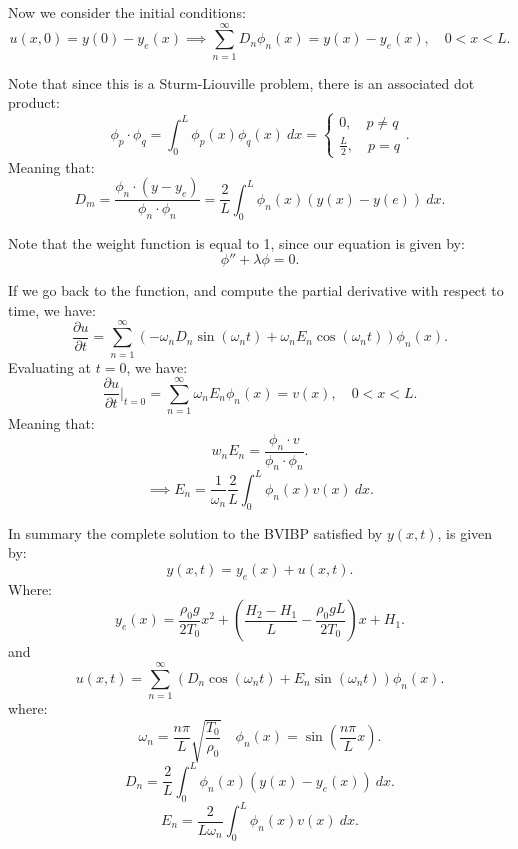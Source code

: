 \documentclass[../main/main.tex]{subfiles}
\begin{document}
Now we consider the initial conditions: \[
	u(x,0) = y(0) - y_e(x) \implies \sum_{n=1}^{\infty} D_n \phi_n(x) = y(x) - y_e(x), \quad 0 < x < L
.\] 

Note that since this is a Sturm-Liouville problem, there is an associated dot product: \[
	\phi_p \cdot  \phi_q = \int^L_0 \phi_p(x) \phi_q(x) ~dx = \begin{cases}
		0, \quad p\neq q \\ \frac{L}{2},\quad p = q
	\end{cases}
.\] Meaning that: \[
D_m = \frac{\phi_n \cdot  (y-y_e)}{\phi_n \cdot  \phi_n} = \frac{2}{L}\int^L_0 \phi_n(x) \left( y(x) - y(e) \right) ~dx
.\] 
\begin{remark}
	Note that the weight function is equal to 1, since our equation is given by: \[
	\phi'' + \lambda \phi = 0
	.\] 
\end{remark}

If we go back to the function, and compute the partial derivative with respect to time, we have: \[
	\frac{\partial u}{\partial t} = \sum_{n=1}^{\infty} \left( -\omega_n D_n \sin(\omega_nt) + \omega_n E_n \cos(\omega_n t)  \right) \phi_n(x)
.\] Evaluating at  $t=0$, we have: \[
	\frac{\partial u}{\partial t}\bigg\rvert_{t=0} = \sum_{n=1}^{\infty} \omega_n E_n \phi_n (x) = v(x) , \quad 0 < x < L 
.\]  Meaning that: \[
w_n E_n = \frac{\phi_n \cdot  v}{\phi_n \cdot  \phi_n}
.\] \[
\implies E_n = \frac{1}{\omega_n} \frac{2}{L} \int^L_0 \phi_n(x) v(x) ~dx
.\] 

In summary the complete solution to the BVIBP satisfied by $y(x,t)$, is given by: \[
	y(x,t) = y_e(x) + u(x,t)
.\] Where: \[
y_e(x) = \frac{\rho_0g}{2T_0} x^2 + \left( \frac{H_2-H_1}{L}- \frac{\rho_0gL}{2T_0} \right) x + H_1
.\] and \[
u(x,t) = \sum_{n=1}^{\infty} \left( D_n \cos(\omega_nt) + E_n \sin(\omega_nt) \right) \phi_n(x)
.\] where: \[
\omega_n = \frac{n\pi}{L}\sqrt{\frac{T_0}{\rho_0}} \quad \phi_n(x) = \sin\left( \frac{n\pi}{L}x \right) 
.\] \[
D_n = \frac{2}{L} \int^L_0 \phi_n(x) (y(x) - y_e(x) )~dx
.\] \[
E_n = \frac{2}{L \omega_n} \int^L_0 \phi_n(x) v(x) ~dx
.\] 
\end{document}
